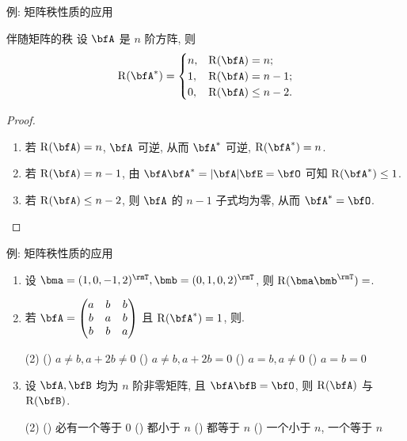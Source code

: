 \begin{frame}{例: 矩阵秩性质的应用}
	\onslide<+->
	\begin{algorithm}{伴随矩阵的秩}
		设 $\bfA$ 是 $n$ 阶方阵, 则
		\[\rank(\bfA^*)=\begin{cases}
			n,&\rank(\bfA)=n;\\
			1,&\rank(\bfA)=n-1;\\
			0,&\rank(\bfA)\le n-2.
		\end{cases}\]
	\end{algorithm}
	\onslide<+->
	\begin{proof}
		\begin{enumerate}
			\item 若 $\rank(\bfA)=n$, $\bfA$ 可逆, 从而 $\bfA^*$ 可逆, $\rank(\bfA^*)=n$.
			\item 若 $\rank(\bfA)=n-1$, 由 $\bfA\bfA^*=|\bfA|\bfE=\bfO$ 可知 $\rank(\bfA^*)\le 1$.
			\onslide<+->{故 $\rank(\bfA^*)=1$.}
			\item 若 $\rank(\bfA)\le n-2$, 则 $\bfA$ 的 $n-1$ 子式均为零, 从而 $\bfA^*=\bfO$.\qedhere
		\end{enumerate}
	\end{proof}
\end{frame}


\begin{frame}{例: 矩阵秩性质的应用}
	\onslide<+->
	\begin{exercise}
		\begin{enumerate}
			\item 设 $\bma=(1,0,-1,2)^\rmT,\bmb=(0,1,0,2)^\rmT$, 则 $\rank(\bma\bmb^\rmT)=$.
			\item 若 $\bfA=\begin{pmatrix}
				a&b&b\\
				b&a&b\\
				b&b&a
			\end{pmatrix}$ 且 $\rank(\bfA^*)=1$, 则.
			\begin{exchoice}(2)
				() $a\neq b,a+2b\neq 0$
				() $a\neq b,a+2b=0$
				() $a=b,a\neq 0$
				() $a=b=0$
			\end{exchoice}
			\item 设 $\bfA,\bfB$ 均为 $n$ 阶非零矩阵, 且 $\bfA\bfB=\bfO$, 则 $\rank(\bfA)$ 与 $\rank(\bfB)$.
			\begin{exchoice}(2)
				() 必有一个等于 $0$
				() 都小于 $n$
				() 都等于 $n$
				() 一个小于 $n$, 一个等于 $n$
			\end{exchoice}
		\end{enumerate}
	\end{exercise}
\end{frame}


